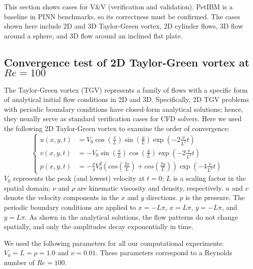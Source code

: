 This section shows cases for V\&V (verification and validation).
PetIBM is a baseline in PINN benchmarks, so its correctness must be confirmed.
The cases shown here include 2D and 3D Taylor-Green vortex, 2D cylinder flows, 3D flow around a sphere, and 3D flow around an inclined flat plate.

\subsection*{Convergence test of 2D Taylor-Green vortex at $Re=100$}

The Taylor-Green vortex (TGV) represents a family of flows with a specific form of analytical initial flow conditions in 2D and 3D.
Specifically, 2D TGV problems with periodic boundary conditions have closed-form analytical solutions; hence, they usually serve as standard verification cases for CFD solvers. 
Here we used the following 2D Taylor-Green vortex to examine the order of convergence:
\begin{equation}\label{eq:tgv}
    \left\{
        \begin{aligned}
            u(x, y, t) &= V_0\cos(\frac{x}{L})\sin(\frac{y}{L})\exp(-2\frac{\nu}{L^2}t) \\
            v(x, y, t) &= - V_0 \sin(\frac{x}{L})\cos(\frac{y}{L})\exp(-2\frac{\nu}{L^2}t) \\
            p(x, y, t) &= -\frac{\rho}{4}V_0^2\left(cos(\frac{2x}{L}) + cos(\frac{2y}{L})\right)\exp(-4\frac{\nu}{L^2}t)
        \end{aligned}
    \right.
\end{equation}
$V_0$ represents the peak (and lowest) velocity at $t=0$;
$L$ is a scaling factor in the spatial domain;
$\nu$ and $\rho$ are kinematic viscosity and density, respectively.
$u$ and $v$ denote the velocity components in the $x$ and $y$ directions.
$p$ is the pressure.
The periodic boundary conditions are applied to $x=-L\pi$, $x=L\pi$, $y=-L\pi$, and $y=L\pi$.
As shown in the analytical solutions, the flow patterns do not change spatially, and only the amplitudes decay exponentially in time.

We used the following parameters for all our computational experiments: $V_0=L=\rho=1.0$ and $\nu=0.01$.
These parameters correspond to a Reynolds number of $Re=100$.

